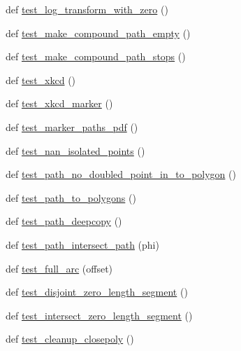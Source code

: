 \begin{DoxyCompactItemize}
\item 
def \hyperlink{namespacematplotlib_1_1tests_1_1test__path_aa0845003e3ab98968b8617be238132c2}{test\+\_\+log\+\_\+transform\+\_\+with\+\_\+zero} ()
\item 
def \hyperlink{namespacematplotlib_1_1tests_1_1test__path_a7702e0f3490a7a0ebea94352e44ef502}{test\+\_\+make\+\_\+compound\+\_\+path\+\_\+empty} ()
\item 
def \hyperlink{namespacematplotlib_1_1tests_1_1test__path_a87434b689ddb282261777446e8691602}{test\+\_\+make\+\_\+compound\+\_\+path\+\_\+stops} ()
\item 
def \hyperlink{namespacematplotlib_1_1tests_1_1test__path_a4330943bdaba152188cfe85ec3e97ae7}{test\+\_\+xkcd} ()
\item 
def \hyperlink{namespacematplotlib_1_1tests_1_1test__path_a28a4cd900f0bdb6e43f024cd99bd940c}{test\+\_\+xkcd\+\_\+marker} ()
\item 
def \hyperlink{namespacematplotlib_1_1tests_1_1test__path_abd153df8d9e20c515afe9f3b60c4edfa}{test\+\_\+marker\+\_\+paths\+\_\+pdf} ()
\item 
def \hyperlink{namespacematplotlib_1_1tests_1_1test__path_a01a249d5371440385e4949d87c51c9bb}{test\+\_\+nan\+\_\+isolated\+\_\+points} ()
\item 
def \hyperlink{namespacematplotlib_1_1tests_1_1test__path_a4f739953b40708a90c634df531eb744f}{test\+\_\+path\+\_\+no\+\_\+doubled\+\_\+point\+\_\+in\+\_\+to\+\_\+polygon} ()
\item 
def \hyperlink{namespacematplotlib_1_1tests_1_1test__path_ac7f028fae5befaea28d189d40f035074}{test\+\_\+path\+\_\+to\+\_\+polygons} ()
\item 
def \hyperlink{namespacematplotlib_1_1tests_1_1test__path_ae0e2f0a50abee368508d8f6333b96493}{test\+\_\+path\+\_\+deepcopy} ()
\item 
def \hyperlink{namespacematplotlib_1_1tests_1_1test__path_a100480c34ef4702a833b237886a1afaf}{test\+\_\+path\+\_\+intersect\+\_\+path} (phi)
\item 
def \hyperlink{namespacematplotlib_1_1tests_1_1test__path_a846528d848de3db7ca52a215ad3f010b}{test\+\_\+full\+\_\+arc} (offset)
\item 
def \hyperlink{namespacematplotlib_1_1tests_1_1test__path_aee30920628d3a9955fd5bd107b8e7065}{test\+\_\+disjoint\+\_\+zero\+\_\+length\+\_\+segment} ()
\item 
def \hyperlink{namespacematplotlib_1_1tests_1_1test__path_ac027cb4f1f9bdab4a87a62daf8fa5424}{test\+\_\+intersect\+\_\+zero\+\_\+length\+\_\+segment} ()
\item 
def \hyperlink{namespacematplotlib_1_1tests_1_1test__path_ac23d4b38c553e3abbd824af281cb746b}{test\+\_\+cleanup\+\_\+closepoly} ()
\end{DoxyCompactItemize}



